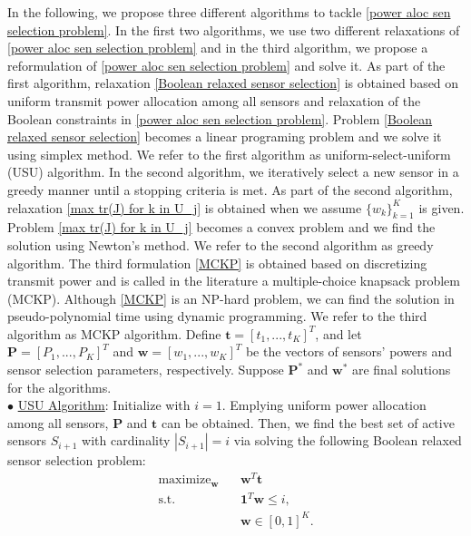 \documentclass[conference]{IEEEtran}
\begin{document}
In the following, we propose three different algorithms to tackle \eqref{power aloc sen selection problem}. In the first two algorithms, we use two different relaxations of \eqref{power aloc sen selection problem} and in the third algorithm, we propose a reformulation of \eqref{power aloc sen selection problem} and solve it. As part of the first algorithm, relaxation \eqref{Boolean relaxed sensor selection} is obtained based on uniform transmit power allocation among all sensors and relaxation of the Boolean constraints in \eqref{power aloc sen selection problem}. Problem \eqref{Boolean relaxed sensor selection} becomes a linear programing problem and we solve it using simplex method. We refer to the first algorithm as uniform-select-uniform (USU) algorithm. In the second algorithm, we iteratively select a new sensor in a greedy manner until a stopping criteria is met. As part of the second algorithm, relaxation \eqref{max tr(J) for k in U_j} is obtained when we assume $\{w_k\}_{k=1}^{K}$ is given. Problem \eqref{max tr(J) for k in U_j} becomes a convex problem and we find the solution using Newton's method. We refer to the second algorithm as greedy algorithm. The third formulation \eqref{MCKP} is obtained based on discretizing transmit power and is called in the literature a multiple-choice knapsack problem (MCKP). Although \eqref{MCKP} is an NP-hard problem, we can find the solution in pseudo-polynomial time using dynamic programming. We refer to the third algorithm as MCKP algorithm. Define $\boldsymbol{t}\!=\![t_1,..., t_K]^T$, and let $\boldsymbol{P}\!=\![P_1,..., P_K]^T$ and $\boldsymbol{w}\!=\![w_1,..., w_K]^T$ be the vectors of sensors' powers and sensor selection parameters, respectively. Suppose $\boldsymbol{P}^{*}$ and $\boldsymbol{w}^{*}$ are final solutions for the algorithms.\\
$\bullet$ \underline{USU Algorithm}:
Initialize with $i=1$. Emplying uniform power allocation among all sensors, $\boldsymbol{P}$ and $\boldsymbol{t}$ can be obtained. Then, we find the best set of active sensors $S_{i+1}$ with cardinality $|S_{i+1}|=i$ via solving the following Boolean relaxed sensor selection problem:
%
\begin{align} \tag{P2}\label{Boolean relaxed sensor selection}
\mathop{\text{maximize}}_{\boldsymbol{w}}\ \ \ \ &\boldsymbol{w}^T\boldsymbol{t}\nonumber\\
\text{s.t.}\ \ \ \ &\boldsymbol{1}^T\boldsymbol{w}\leq i,\nonumber\\
&\boldsymbol{w}\in [0,1]^K.\nonumber
\end{align}
\end{document}
